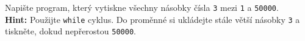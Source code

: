 \question[50]
Napište program, který vytiskne všechny násobky čísla \texttt{3} mezi \texttt{1}
a \texttt{50000}.\\
\textbf{Hint:} Použijte \texttt{while} cyklus. Do proměnné si ukládejte stále
větší násobky \texttt{3} a tiskněte, dokud nepřerostou \texttt{50000}.
